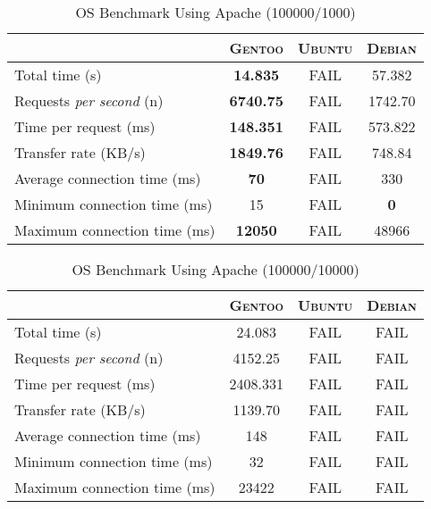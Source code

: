 \begin{table}[h!t]
  \centering
  \caption{OS Benchmark Using Apache (100000/1000)}
  \label{tab:os_apache_100000_1000}
  
  \begin{tabular}{l|c|c|c}
    
    & \textbf{\textsc{Gentoo}} & \textbf{\textsc{Ubuntu}} & \textbf{\textsc{Debian}} \\ \hline
    Total time (s) & \textbf{14.835} & FAIL & 57.382 \\ \hline
    Requests \textit{per second} (n) & \textbf{6740.75} & FAIL & 1742.70 \\ \hline
    Time per request (ms) & \textbf{148.351} & FAIL & 573.822 \\ \hline
    Transfer rate (KB/s) & \textbf{1849.76} & FAIL & 748.84 \\ \hline
    Average connection time (ms) & \textbf{70} & FAIL & 330 \\ \hline
    Minimum connection time (ms) & 15 & FAIL & \textbf{0} \\ \hline
    Maximum connection time (ms) & \textbf{12050} & FAIL & 48966 \\
  \end{tabular}
\end{table}

\begin{table}[h!t]
  \centering
  \caption{OS Benchmark Using Apache (100000/10000)}
  \label{tab:os_apache_100000_10000}
  
  \begin{tabular}{l|c|c|c}
  
    & \textbf{\textsc{Gentoo}} & \textbf{\textsc{Ubuntu}} & \textbf{\textsc{Debian}} \\ \hline
    Total time (s) & 24.083 & FAIL & FAIL \\ \hline
    Requests \textit{per second} (n) & 4152.25 & FAIL & FAIL \\ \hline
    Time per request (ms) & 2408.331 & FAIL & FAIL \\ \hline
    Transfer rate (KB/s) & 1139.70 & FAIL & FAIL \\ \hline
    Average connection time (ms) & 148 & FAIL & FAIL \\ \hline
    Minimum connection time (ms) & 32 & FAIL & FAIL \\ \hline
    Maximum connection time (ms) & 23422 & FAIL & FAIL \\
  \end{tabular}
\end{table}

